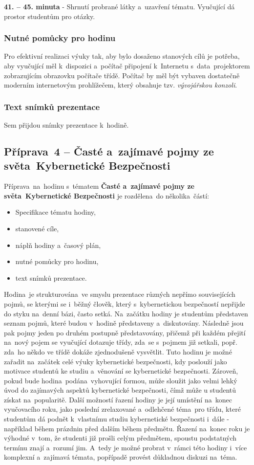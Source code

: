 \documentclass[a4paper, 12pt]{article}
\begin{document}
\textbf{41. -- 45. minuta} - Shrnutí probrané látky a~uzavření tématu. Vyučující dá prostor studentům pro otázky.

\subsubsection{Nutné pomůcky pro hodinu}
Pro efektivní realizaci výuky tak, aby bylo dosaženo stanových cílů je potřeba, aby vyučující měl k~dispozici a~počítač připojení k~Internetu s~data~projektorem zobrazujícím obrazovku počítače třídě. Počítač by měl být vybaven dostatečně moderním internetovým prohlížečem, který obsahuje tzv. \textit{vývojářskou konzoli}.

\subsubsection{Text snímků prezentace}
Sem přijdou snímky prezentace k~hodině.


\subsection{Příprava~4 -- Časté a~zajímavé pojmy ze světa~Kybernetické Bezpečnosti}
Příprava~na~hodinu s~tématem \textbf{Časté a~zajímavé pojmy ze světa~Kybernetické Bezpečnosti} je rozdělena~do několika~částí:
\begin{itemize}
        \setlength{\itemsep}{-3pt}
        \item Specifikace tématu hodiny,
        \item stanovené cíle,
        \item náplň hodiny a~časový plán,
        \item nutné pomůcky pro hodinu,
        \item text snímků prezentace.
\end{itemize}

Hodina~je strukturována~ve smyslu prezentace různých nepřímo souvisejících pojmů, se kterými se i~běžný člověk, který s~kybernetickou bezpečností nepřijde do styku na~denní bázi, často setká. Na~začátku hodiny je studentům představen seznam pojmů, které budou v~hodině představeny a~diskutovány. Následně jsou pak pojmy jeden po druhém postupně představovány, přičemž při každém přejití na~nový pojem se vyučující dotazuje třídy, zda~se s~pojmem již setkali, popř. zda~ho někdo ve třídě dokáže zjednodušeně vysvětlit. Tuto hodinu je možné zařadit na~začátek celé výuky kybernetické bezpečnosti, kdy poslouží jako motivace studentů ke studiu a~věnování se kybernetické bezpečnosti. Zároveň, pokud bude hodina~podána~vyhovující formou, může sloužit jako velmi lehký úvod do zajímavých aspektů kybernetické bezpečnosti, čímž může u studentů získat na~popularitě. Další možností řazení hodiny je její umístění na~konec vyučovacího roku, jako poslední zrelaxované a~odlehčené téma~pro třídu, které studentům dá podnět k~vlastnímu studiu kybernetické bezpečnosti i~dále - například během prázdnin před dalším během předmětu. Řazení na~konec roku je výhodné v~tom, že studenti již prošli celým předmětem, spoustu podstatných termínu znají a~rozumí jim. A~tedy je možné probrat v~rámci této hodiny i~více komplexní a~zajímavá témata, popřípadě provést důkladnou diskuzi na~téma.
\end{document}
